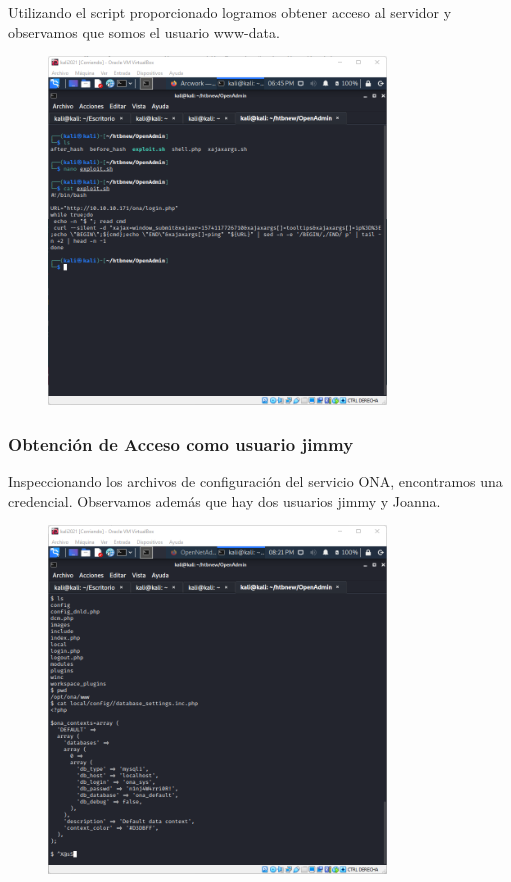 \documentclass{article}
\begin{document}
Utilizando el script proporcionado logramos obtener acceso al servidor y observamos que somos el usuario www-data.
\begin{figure}[h]
	\center
	\includegraphics[width=0.8\textwidth]{images/openadmin/7-script.png}
	\caption{}
\end{figure}

\subsubsection{Obtención de Acceso como usuario jimmy}

Inspeccionando los archivos de configuración del servicio ONA, encontramos una credencial. Observamos además que hay dos usuarios jimmy y Joanna.
\begin{figure}[h]
	\center
	\includegraphics[width=0.8\textwidth]{images/openadmin/8-credencialesjimmy.png}
	\caption{}
\end{figure}
\end{document}
